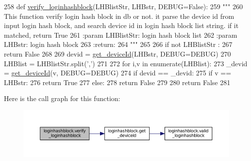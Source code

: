 \begin{DoxyCode}
258 \textcolor{keyword}{def }\hyperlink{namespaceloginhashblock_aa5bb94484a68d0bbebce23b4cfeeb4b7}{verify\_loginhashblock}(LHBlistStr, LHBstr, DEBUG=False):
259     \textcolor{stringliteral}{"""}
260 \textcolor{stringliteral}{    This function verify login hash block in db or not. it parse the device id from input login hash block,
       and search device id in login hash block list string. if it matched, return True}
261 \textcolor{stringliteral}{    :param LHBlistStr: login hash block list}
262 \textcolor{stringliteral}{    :param LHBstr: login hash block}
263 \textcolor{stringliteral}{    :return:}
264 \textcolor{stringliteral}{    """}
265 
266     \textcolor{keywordflow}{if} \textcolor{keywordflow}{not} LHBlistStr :
267         \textcolor{keywordflow}{return} \textcolor{keyword}{False}
268 
269     devid = \hyperlink{namespaceloginhashblock_a17417f2f6bca76ab51170082a562e5f6}{get\_deviceId}(LHBstr, DEBUG=DEBUG)
270     LHBlist = LHBlistStr.split(\textcolor{stringliteral}{','})
271 
272     \textcolor{keywordflow}{for} i,v \textcolor{keywordflow}{in} enumerate(LHBlist):
273         \_devid = \hyperlink{namespaceloginhashblock_a17417f2f6bca76ab51170082a562e5f6}{get\_deviceId}(v, DEBUG=DEBUG)
274         \textcolor{keywordflow}{if} devid == \_devid:
275             \textcolor{keywordflow}{if} v == LHBstr:
276                 \textcolor{keywordflow}{return} \textcolor{keyword}{True}
277             \textcolor{keywordflow}{else}:
278                 \textcolor{keywordflow}{return} \textcolor{keyword}{False}
279 
280     \textcolor{keywordflow}{return} \textcolor{keyword}{False}
281 
\end{DoxyCode}


Here is the call graph for this function\+:\nopagebreak
\begin{figure}[H]
\begin{center}
\leavevmode
\includegraphics[width=350pt]{namespaceloginhashblock_aa5bb94484a68d0bbebce23b4cfeeb4b7_cgraph}
\end{center}
\end{figure}




